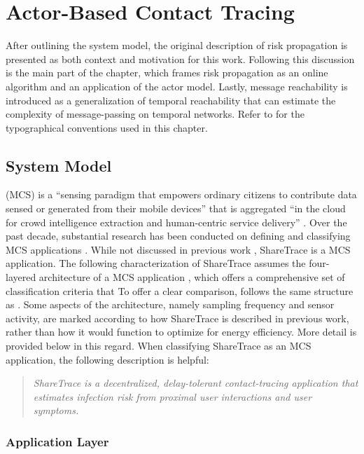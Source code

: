 \chapter{Actor-Based Contact Tracing}

After outlining the system model, the original description of risk propagation is presented as both context and motivation for this work. Following this discussion is the main part of the chapter, which frames risk propagation as an online algorithm and an application of the actor model. Lastly, message reachability is introduced as a generalization of temporal reachability that can estimate the complexity of message-passing on temporal networks. Refer to  for the typographical conventions used in this chapter.

\section{System Model}

 (MCS) is a ``sensing paradigm that empowers ordinary citizens to contribute data sensed or generated from their mobile devices'' that is aggregated  ``in the cloud for crowd intelligence extraction and human-centric service delivery'' \cite{Guo2015}. Over the past decade, substantial research has been conducted on defining and classifying MCS applications \cite[and references therein]{Capponi2019, Guo2015}. While not discussed in previous work \cite{Ayday2020, Ayday2021}, ShareTrace is a MCS application. The following characterization of ShareTrace assumes the four-layered architecture of a MCS application \cite{Capponi2019}, which offers a comprehensive set of classification criteria that To offer a clear comparison,  follows the same structure as \cite{Capponi2019}. Some aspects of the architecture, namely sampling frequency and sensor activity, are marked according to how ShareTrace is described in previous work, rather than how it would function to optimize for energy efficiency. More detail is provided below in this regard. When classifying ShareTrace as an MCS application, the following description is helpful:
%
\begin{quote}
	\emph{ShareTrace is a decentralized, delay-tolerant contact-tracing application that estimates infection risk from proximal user interactions and user symptoms.}
\end{quote}

\subsection{Application Layer}

